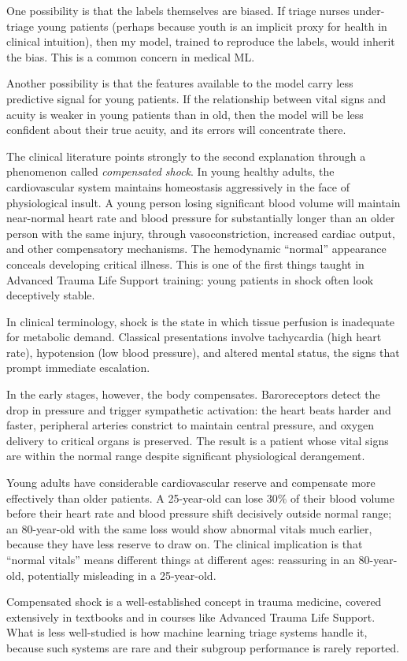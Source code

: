 One possibility is that the labels themselves are biased. If triage nurses under-triage young patients (perhaps because youth is an implicit proxy for health in clinical intuition), then my model, trained to reproduce the labels, would inherit the bias. This is a common concern in medical ML.

Another possibility is that the features available to the model carry less predictive signal for young patients. If the relationship between vital signs and acuity is weaker in young patients than in old, then the model will be less confident about their true acuity, and its errors will concentrate there.

The clinical literature points strongly to the second explanation through a phenomenon called \emph{compensated shock}. In young healthy adults, the cardiovascular system maintains homeostasis aggressively in the face of physiological insult. A young person losing significant blood volume will maintain near-normal heart rate and blood pressure for substantially longer than an older person with the same injury, through vasoconstriction, increased cardiac output, and other compensatory mechanisms. The hemodynamic ``normal'' appearance conceals developing critical illness. This is one of the first things taught in Advanced Trauma Life Support training: young patients in shock often look deceptively stable.

\begin{notebox}
In clinical terminology, shock is the state in which tissue perfusion is inadequate for metabolic demand. Classical presentations involve tachycardia (high heart rate), hypotension (low blood pressure), and altered mental status, the signs that prompt immediate escalation.

In the early stages, however, the body compensates. Baroreceptors detect the drop in pressure and trigger sympathetic activation: the heart beats harder and faster, peripheral arteries constrict to maintain central pressure, and oxygen delivery to critical organs is preserved. The result is a patient whose vital signs are within the normal range despite significant physiological derangement.

Young adults have considerable cardiovascular reserve and compensate more effectively than older patients. A 25-year-old can lose $30\%$ of their blood volume before their heart rate and blood pressure shift decisively outside normal range; an 80-year-old with the same loss would show abnormal vitals much earlier, because they have less reserve to draw on. The clinical implication is that ``normal vitals'' means different things at different ages: reassuring in an 80-year-old, potentially misleading in a 25-year-old.

Compensated shock is a well-established concept in trauma medicine, covered extensively in textbooks and in courses like Advanced Trauma Life Support. What is less well-studied is how machine learning triage systems handle it, because such systems are rare and their subgroup performance is rarely reported.
\end{notebox}


